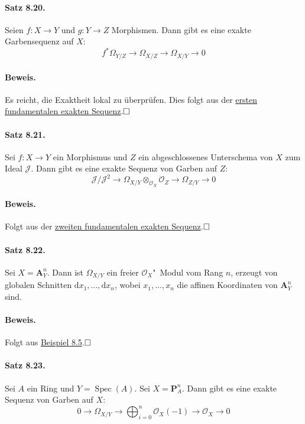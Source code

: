 \documentclass[11pt,b5paper,openany]{memoir}
\def \qed {$\hfill\square$}
\begin{document}
\paragraph{Satz 8.20.}\label{8.20} Seien $f:X\to Y$ und $g:Y\to Z$ Morphismen. Dann gibt es eine exakte Garbensequenz auf $X$:
\[f^\ast\Omega_{Y/Z}\longrightarrow\Omega_{X/Z}\longrightarrow\Omega_{X/Y}\longrightarrow 0 \]

\paragraph{Beweis.} Es reicht, die Exaktheit lokal zu überprüfen. Dies folgt aus der \hyperref[8.7]{ersten fundamentalen exakten Sequenz}.\qed

\paragraph{Satz 8.21.}\label{8.21} Sei $f:X\to Y$ ein Morphismus und $Z$ ein abgeschlossenes Unterschema von $X$ zum Ideal $\mathcal{J}$. Dann gibt es eine exakte Sequenz von Garben auf $Z$:
\[\mathcal{J}/\mathcal{J}^2 \longrightarrow \Omega_{X/Y}\otimes_{\mathcal{O}_X}\mathcal{O}_Z\longrightarrow\Omega_{Z/Y}\longrightarrow 0 \]

\paragraph{Beweis.} Folgt aus der \hyperref[8.9]{zweiten fundamentalen exakten Sequenz}.\qed

\paragraph{Satz 8.22.}\label{8.22} Sei $X=\mathbf{A}_Y^n$. Dann ist $\Omega_{X/Y}$ ein freier $\mathcal{O}_X$"~Modul vom Rang $n$, erzeugt von globalen Schnitten $\mathrm{d}x_1,\ldots,\mathrm{d}x_n$, wobei $x_1,\ldots,x_n$ die affinen Koordinaten von $\mathbf{A}_Y^n$ sind.

\paragraph{Beweis.} Folgt aus \hyperref[8.5]{Beispiel 8.5}.\qed

\paragraph{Satz 8.23.}\label{8.23} Sei $A$ ein Ring und $Y=\operatorname{Spec}(A)$. Sei $X=\mathbf{P}_A^n$. Dann gibt es eine exakte Sequenz von Garben auf $X$:
\[0\longrightarrow\Omega_{X/Y}\longrightarrow \bigoplus_{i=0}^n\mathcal{O}_X(-1)\longrightarrow \mathcal{O}_X\longrightarrow 0 \]
\end{document}
